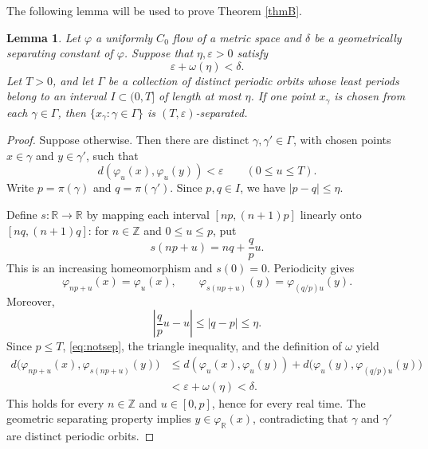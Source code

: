 \documentclass[11pt,reqno]{amsart}
\newtheorem{lemma}[theorem]{Lemma}
\theoremstyle{definition}
\theoremstyle{remark}
\newcommand{\R}{\mathbb{R}}
\begin{document}
The following lemma will be used to prove Theorem \ref{thmB}.

\begin{lemma}\label{lem:window}
Let $\varphi$ a uniformly $C_0$ flow of a metric space and
$\delta$ be a geometrically separating constant of $\varphi$.  Suppose that $\eta,\varepsilon>0$ satisfy
\begin{equation}\label{eq:scale}
 \varepsilon+\omega(\eta)<\delta.
\end{equation}
Let $T>0$, and let $\Gamma$ be a collection of distinct periodic orbits whose
least periods belong to an interval $I\subset(0,T]$ of length at most $\eta$.
If one point $x_\gamma$ is chosen from each $\gamma\in\Gamma$, then
$\{x_\gamma:\gamma\in\Gamma\}$ is $(T,\varepsilon)$-separated.
\end{lemma}

\begin{proof}
Suppose otherwise. Then there are distinct $\gamma,\gamma'\in\Gamma$, with
chosen points $x\in\gamma$ and $y\in\gamma'$, such that
\begin{equation}\label{eq:notsep}
 d(\varphi_u(x),\varphi_u(y))<\varepsilon
 \qquad(0\le u\le T).
\end{equation}
Write $p=\pi(\gamma)$ and $q=\pi(\gamma')$.  Since $p,q\in I$, we have
$|p-q|\le\eta$.

Define $s\colon\R\to\R$ by mapping each interval $[np,(n+1)p]$ linearly
onto $[nq,(n+1)q]$: for $n\in\mathbb Z$ and $0\le u\le p$, put
\[
 s(np+u)=nq+\frac{q}{p}u.
\]
This is an increasing homeomorphism and $s(0)=0$.  Periodicity gives
\[
 \varphi_{np+u}(x)=\varphi_u(x),
 \qquad
 \varphi_{s(np+u)}(y)=\varphi_{(q/p)u}(y).
\]
Moreover,
\[
 \left|\frac{q}{p}u-u\right|
 \le |q-p|\le\eta.
\]
Since $p\le T$, \eqref{eq:notsep}, the triangle inequality, and the definition
of $\omega$ yield
\begin{align*}
 d\bigl(\varphi_{np+u}(x),\varphi_{s(np+u)}(y)\bigr)
 &\le d(\varphi_u(x),\varphi_u(y))
      +d\bigl(\varphi_u(y),\varphi_{(q/p)u}(y)\bigr)\\
 &<\varepsilon+\omega(\eta)<\delta.
\end{align*}
This holds for every $n\in\mathbb Z$ and $u\in[0,p]$, hence for every real
time.  The geometric separating property implies $y\in\varphi_{\R}(x)$, contradicting
that $\gamma$ and $\gamma'$ are distinct periodic orbits.
\end{proof}
\end{document}
